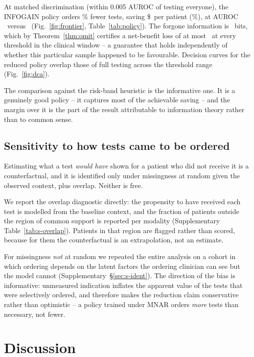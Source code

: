 \documentclass[11pt]{article}
\theoremstyle{definition}
\theoremstyle{remark}
\begin{document}
At matched discrimination (within 0.005 AUROC of testing everyone), the INFOGAIN
policy orders \redTestsAvoided\% fewer tests, saving \$\redCostSaved\ per patient
(\redCostSavedPct\%), at AUROC \redAuroc\ versus \redAurocAll\
(Fig.~\ref{fig:frontier}, Table~\ref{tab:policy}). The forgone information is
\redInfoGap\ bits, which by
Theorem~\ref{thm:omit} certifies a net-benefit loss of at most
\redCertifiedLoss\ at every threshold in the clinical window -- a guarantee that
holds independently of whether this particular sample happened to be favourable.
Decision curves for the reduced policy overlap those of full testing across the
threshold range (Fig.~\ref{fig:dca}).

The comparison against the risk-band heuristic is the informative one. It is a
genuinely good policy -- it captures most of the achievable saving -- and the
margin over it is the part of the result attributable to information theory
rather than to common sense.

\subsection{Sensitivity to how tests came to be ordered}

Estimating what a test \emph{would have} shown for a patient who did not receive
it is a counterfactual, and it is identified only under missingness at random
given the observed context, plus overlap. Neither is free.

We report the overlap diagnostic directly: the propensity to have received each
test is modelled from the baseline context, and the fraction of patients outside
the region of common support is reported per modality (Supplementary Table~\ref{tab:s-overlap}).
Patients in that region are flagged rather than scored, because for them the
counterfactual is an extrapolation, not an estimate.

For missingness \emph{not} at random we repeated the entire analysis on a cohort
in which ordering depends on the latent factors the ordering clinician can see
but the model cannot (Supplementary~\S\ref{sec:s-ident}). The direction of the bias is
informative: unmeasured indication inflates the apparent value of the tests that
were selectively ordered, and therefore makes the reduction claim conservative
rather than optimistic -- a policy trained under MNAR orders \emph{more} tests
than necessary, not fewer.

\section{Discussion}
\end{document}
